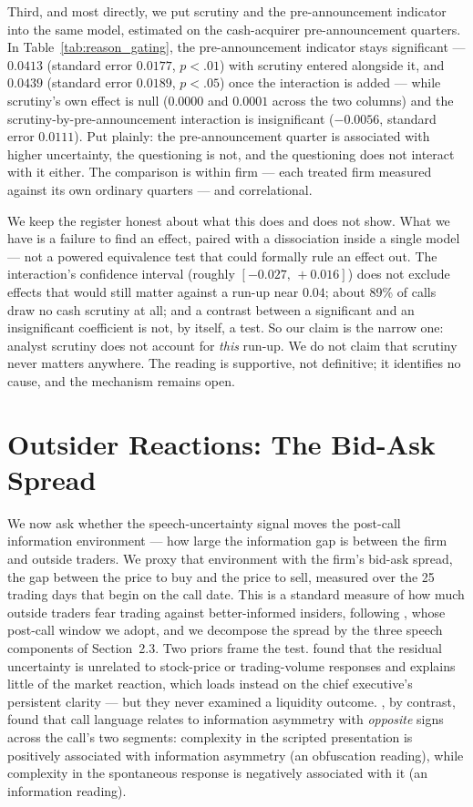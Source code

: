 Third, and most directly, we put scrutiny and the pre-announcement indicator into the same model, estimated on the cash-acquirer pre-announcement quarters. In Table~\ref{tab:reason_gating}, the pre-announcement indicator stays significant --- $0.0413$ (standard error $0.0177$, $p<.01$) with scrutiny entered alongside it, and $0.0439$ (standard error $0.0189$, $p<.05$) once the interaction is added --- while scrutiny's own effect is null ($0.0000$ and $0.0001$ across the two columns) and the scrutiny-by-pre-announcement interaction is insignificant ($-0.0056$, standard error $0.0111$). Put plainly: the pre-announcement quarter is associated with higher uncertainty, the questioning is not, and the questioning does not interact with it either. The comparison is within firm --- each treated firm measured against its own ordinary quarters --- and correlational.

We keep the register honest about what this does and does not show. What we have is a failure to find an effect, paired with a dissociation inside a single model --- not a powered equivalence test that could formally rule an effect out. The interaction's confidence interval (roughly $[-0.027,\,+0.016]$) does not exclude effects that would still matter against a run-up near $0.04$; about 89\% of calls draw no cash scrutiny at all; and a contrast between a significant and an insignificant coefficient is not, by itself, a test. So our claim is the narrow one: analyst scrutiny does not account for \emph{this} run-up. We do not claim that scrutiny never matters anywhere. The reading is supportive, not definitive; it identifies no cause, and the mechanism remains open.

\section{Outsider Reactions: The Bid-Ask Spread}

We now ask whether the speech-uncertainty signal moves the post-call information environment --- how large the information gap is between the firm and outside traders. We proxy that environment with the firm's bid-ask spread, the gap between the price to buy and the price to sell, measured over the 25 trading days that begin on the call date. This is a standard measure of how much outside traders fear trading against better-informed insiders, following \citet{bgt2018}, whose post-call window we adopt, and we decompose the spread by the three speech components of Section~2.3. Two priors frame the test. \citet{dwz} found that the residual uncertainty is unrelated to stock-price or trading-volume responses and explains little of the market reaction, which loads instead on the chief executive's persistent clarity --- but they never examined a liquidity outcome. \citet{bgt2018}, by contrast, found that call language relates to information asymmetry with \emph{opposite} signs across the call's two segments: complexity in the scripted presentation is positively associated with information asymmetry (an obfuscation reading), while complexity in the spontaneous response is negatively associated with it (an information reading).

